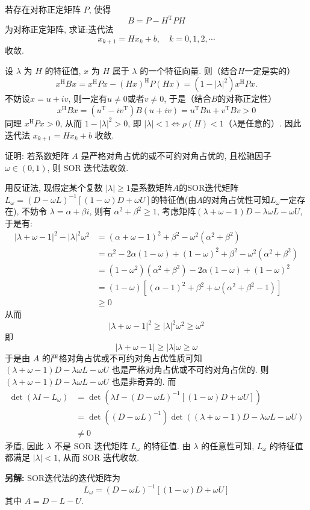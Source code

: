 \documentclass[12pt, answers]{exam}     %
\newcommand{\anothersolution}{\par\noindent\textbf{另解:}}
\newcommand{\T}{\mathrm{T}}
\newcommand{\HH}{\mathrm{H}}
\begin{document}
\begin{questions}
\question{}若存在对称正定矩阵 \( P \), 使得
\[
B = P - H^{\T} P H
\]
为对称正定矩阵, 求证:迭代法
\[
x_{k+1} = H x_k + b, \quad k = 0, 1, 2, \cdots
\]
收敛. 

\begin{solution}
设 \(\lambda\) 为 \(H\) 的特征值, \(x\) 为 \(H\) 属于 \(\lambda\) 的一个特征向量. 则（结合$H$一定是实的）
\[
x^{\HH} B x = x^{\HH} P x - (H x)^{\HH} P (H x) = (1 - |\lambda|^{2}) x^{\HH} P x. 
\]
不妨设$x = u + iv$, 则一定有$u \neq 0$或者$v \neq 0$, 于是（结合$B$的对称正定性）
\[
x^{\HH} B x = (u^{\T} - iv^{\T})B(u + iv) = u^{\T} B u + v^{\T} B v > 0
\]
同理 \(x^{\HH} P x > 0\), 从而 \(1 - |\lambda|^{2} > 0\), 
即 \( |\lambda| < 1 \Leftrightarrow \rho(H) < 1\)（$\lambda$是任意的）. 
因此迭代法 \(x_{k+1} = H x_k + b\) 收敛. 
\end{solution}


\question{}证明: 若系数矩阵 \( A \) 是严格对角占优的或不可约对角占优的, 
且松驰因子 \( \omega \in (0, 1) \), 则 SOR 迭代法收敛. 

\begin{solution}
用反证法, 现假定某个复数 \( |\lambda| \geq 1 \)是系数矩阵\( A \)的SOR迭代矩阵\( L_{\omega} = (D - \omega L)^{-1} [(1 - \omega)D + \omega U] \)的特征值(由\( A \)的对角占优性可知\(L_{\omega}\)一定存在), 
不妨令 \( \lambda = \alpha + \beta i \), 则有 \( \alpha^2 + \beta^2 \geq 1 \), 
考虑矩阵\( (\lambda + \omega - 1)D - \lambda \omega L - \omega U \), 于是有:
\begin{align*}
|\lambda + \omega - 1|^2 - |\lambda|^2 \omega^2 &= (\alpha + \omega - 1)^2 + \beta^2 - \omega^2 (\alpha^2 + \beta^2) \\
&= \alpha^2 - 2\alpha (1 - \omega) + (1 - \omega)^2 + \beta^2 - \omega^2 (\alpha^2 + \beta^2) \\
&= (1 - \omega^2)(\alpha^2 + \beta^2) - 2\alpha (1 - \omega) + (1 - \omega)^2 \\
&= (1 - \omega)\left[(\alpha - 1)^2 + \beta^2 + \omega (\alpha^2 + \beta^2 - 1)\right] \\
&\geq 0
\end{align*}
从而
\[
|\lambda + \omega - 1|^2 \geq |\lambda|^2 \omega^2 \geq \omega^2
\]
即
\[
|\lambda + \omega - 1| \geq |\lambda| \omega \geq \omega
\]
于是由 \( A \) 的严格对角占优或不可约对角占优性质可知 \( (\lambda + \omega - 1)D - \lambda \omega L - \omega U \) 也是严格对角占优或不可约对角占优的. 则\( (\lambda + \omega - 1)D - \lambda \omega L - \omega U \) 也是非奇异的. 
而
\begin{align*}
\det(\lambda I - L_{\omega}) &= \det\left(\lambda I - (D - \omega L)^{-1} [(1 - \omega)D + \omega U]\right) \\
&= \det\left((D - \omega L)^{-1}\right) \det\left((\lambda + \omega - 1)D - \lambda \omega L - \omega U\right) \\
&\neq 0
\end{align*}
矛盾, 因此 \( \lambda \) 不是 SOR 迭代矩阵 \( L_{\omega} \) 的特征值. 由 \( \lambda \) 的任意性可知, \( L_{\omega} \) 的特征值都满足 \( |\lambda| < 1 \), 从而 SOR 迭代收敛. 
\anothersolution{}
SOR迭代法的迭代矩阵为
\[
L_{\omega} = (D - \omega L)^{-1}[(1-\omega)D + \omega U]
\]
其中 \( A = D - L - U \).


\end{solution}
\end{questions}
\end{document}
